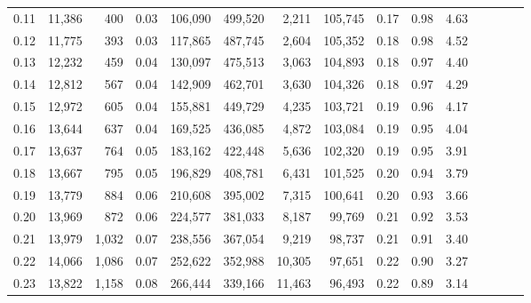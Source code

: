 \begin{tabular}{rrrcrrrrrrrrrrr}
0.11 &  11,386 &    400 &                                       0.03 &  106,090 &  499,520 &    2,211 &  105,745 &  0.17 &  0.98 &                         4.63 \\
0.12 &  11,775 &    393 &                                       0.03 &  117,865 &  487,745 &    2,604 &  105,352 &  0.18 &  0.98 &                         4.52 \\
0.13 &  12,232 &    459 &                                       0.04 &  130,097 &  475,513 &    3,063 &  104,893 &  0.18 &  0.97 &                         4.40 \\
0.14 &  12,812 &    567 &                                       0.04 &  142,909 &  462,701 &    3,630 &  104,326 &  0.18 &  0.97 &                         4.29 \\
0.15 &  12,972 &    605 &                                       0.04 &  155,881 &  449,729 &    4,235 &  103,721 &  0.19 &  0.96 &                         4.17 \\
0.16 &  13,644 &    637 &                                       0.04 &  169,525 &  436,085 &    4,872 &  103,084 &  0.19 &  0.95 &                         4.04 \\
0.17 &  13,637 &    764 &                                       0.05 &  183,162 &  422,448 &    5,636 &  102,320 &  0.19 &  0.95 &                         3.91 \\
0.18 &  13,667 &    795 &                                       0.05 &  196,829 &  408,781 &    6,431 &  101,525 &  0.20 &  0.94 &                         3.79 \\
0.19 &  13,779 &    884 &                                       0.06 &  210,608 &  395,002 &    7,315 &  100,641 &  0.20 &  0.93 &                         3.66 \\
0.20 &  13,969 &    872 &                                       0.06 &  224,577 &  381,033 &    8,187 &   99,769 &  0.21 &  0.92 &                         3.53 \\
0.21 &  13,979 &  1,032 &                                       0.07 &  238,556 &  367,054 &    9,219 &   98,737 &  0.21 &  0.91 &                         3.40 \\
0.22 &  14,066 &  1,086 &                                       0.07 &  252,622 &  352,988 &   10,305 &   97,651 &  0.22 &  0.90 &                         3.27 \\
0.23 &  13,822 &  1,158 &                                       0.08 &  266,444 &  339,166 &   11,463 &   96,493 &  0.22 &  0.89 &                         3.14 \\

\end{tabular}
